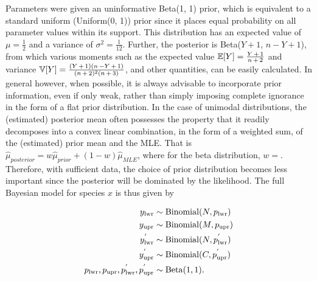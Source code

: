 \documentclass[12pt]{article}
\begin{document}
Parameters were given an uninformative Beta(1, 1) prior, which is equivalent to a standard uniform (Uniform(0, 1)) prior since it places equal probability on all parameter values within its support. This distribution has an expected value of $\mu = \frac{1}{2}$ and a variance of $\sigma^2 = \frac{1}{12}$. Further, the posterior is Beta($Y + 1$, $n - Y + 1$), from which various moments such as the expected value $\mathbb{E}[Y] = \frac{Y \hspace{0.5mm} + \hspace{0.5mm} 1}{n \hspace{0.5mm} + \hspace{0.5mm} 2}$ and variance $\mathbb{V}[Y] = \frac{(Y \hspace{0.5mm} + \hspace{0.5mm} 1)(n \hspace{0.5mm} - Y \hspace{0.5mm} + \hspace{0.5mm} 1)}{(n \hspace{0.5mm} + \hspace{0.5mm} 2)^2(n \hspace{0.5mm} + \hspace{0.5mm} 3)}$, and other quantities, can be easily calculated. In general however, when possible, it is always advisable to incorporate prior information, even if only weak, rather than simply imposing complete ignorance in the form of a flat prior distribution. In the case of unimodal distributions, the (estimated) posterior mean often possesses the property that it readily decomposes into a convex linear combination, in the form of a weighted sum, of the (estimated) prior mean and the MLE. That is $\hat{\mu}_{posterior} = w\hat{\mu}_{prior} + (1-w)\hat{\mu}_{MLE}$, where for the beta distribution, $w = $. Therefore, with sufficient data, the choice of prior distribution becomes less important since the posterior will be dominated by the likelihood. The full Bayesian model for species $x$ is thus given by

\begin{align}
\notag y_\mathrm{lwr} &\sim \mathrm{Binomial}(N, p_\mathrm{lwr}) \\ 
\notag y_\mathrm{upr} &\sim \mathrm{Binomial}(M, p_\mathrm{upr}) \\ 
y^{'}_\mathrm{lwr} &\sim \mathrm{Binomial}(N, p^{'}_\mathrm{lwr}) \\ 
 \notag y^{'}_\mathrm{upr} &\sim \mathrm{Binomial}(C, p^{'}_\mathrm{upr}) \\ 
\notag p_\mathrm{lwr}, p_\mathrm{upr}, p^{'}_\mathrm{lwr}, p^{'}_\mathrm{upr}
&\sim \mathrm{Beta}(1, 1).
\end{align}
\end{document}
